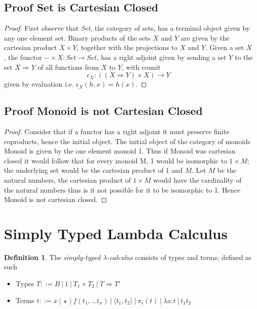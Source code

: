 \documentclass{article}
\theoremstyle{definition}
\newtheorem{definition}{Definition}[section]
\begin{document}
\subsection{Proof Set is Cartesian Closed}
\begin{proof}
    First observe that \textit{Set}, the category of sets,
    has a terminal object given by any one element set.
    Binary products of the sets $X$ and $Y$ are given by the
    cartesian product $X \times Y$,
    together with the projections to $X$ and $Y$.
    Given a set $X$, the functor $- \times X : Set \rightarrow Set$,
    has a right adjoint given by
    sending a set $Y$ to the set $X \Rightarrow Y$ of all functions from $X$ to $Y$,
    with counit
    $$\epsilon_X : ((X \Rightarrow Y) \times X) \rightarrow Y$$
    given by evaluation i.e. $\epsilon_X(h,x) = h(x)$.
\end{proof}

\subsection{Proof Monoid is not Cartesian Closed}
\begin{proof}
    Consider that if a functor has a right adjoint it must preserve finite coproducts,
    hence the initial object.
    The initial object of the category of monoids Monoid is given by the one element monoid 1.
    Thus if Monoid was cartesian closed it would follow that for every monoid M,
    1 would be isomorphic to $1 \times M$;
    the underlying set would be the cartesian product of 1 and $M$.
    Let $M$ be the natural numbers,
    the cartesian product of $1 \times M$ would have the cardinality of the natural numbers
    thus is it not possible for it to be isomorphic to 1.
    Hence Monoid is not cartesian closed.
\end{proof}

\section{Simply Typed Lambda Calculus}
\begin{definition}
    The \textit{simply-typed $\lambda$-calculus} consists of
    types and terms;
    defined as such
    \begin{itemize}
        \item Types
            $T ::= B 
            \ | \ 1
            \ | \ T_1 \times T_2
            \ | \ T \Rightarrow T \prime$
        \item Terms
            $t ::=  x
            \ |\ \star
            \ |\ f(t_1,\dots t_n)
            \ |\ \langle t_1, t_2 \rangle
            \ |\ \pi_i(t)
            \ |\ \lambda x.t
            \ |\ t_1 t_2$
    \end{itemize}
\end{definition}
\end{document}
